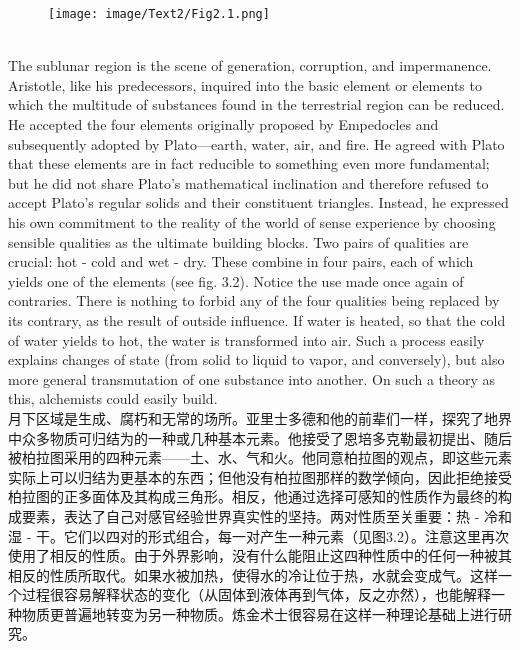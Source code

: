 \documentclass{article}
\begin{document}
\begin{figure} %
    \centering
    \texttt{[image: image/Text2/Fig2.1.png]} %

\end{figure}

\\
The sublunar region is the scene of generation, corruption, and impermanence. Aristotle, like his predecessors, inquired into the basic element or elements to which the multitude of substances found in the terrestrial region can be reduced. He accepted the four elements originally proposed by Empedocles and subsequently adopted by Plato—earth, water, air, and fire. He agreed with Plato that these elements are in fact reducible to something even more fundamental; but he did not share Plato’s mathematical inclination and therefore refused to accept Plato’s regular solids and their constituent triangles. Instead, he expressed his own commitment to the reality of the world of sense experience by choosing sensible qualities as the ultimate building blocks. Two pairs of qualities are crucial: hot - cold and wet - dry. These combine in four pairs, each of which yields one of the elements (see fig. 3.2). Notice the use made once again of contraries. There is nothing to forbid any of the four qualities being replaced by its contrary, as the result of outside influence. If water is heated, so that the cold of water yields to hot, the water is transformed into air. Such a process easily explains changes of state (from solid to liquid to vapor, and conversely), but also more general transmutation of one substance into another. On such a theory as this, alchemists could easily build.\\
月下区域是生成、腐朽和无常的场所。亚里士多德和他的前辈们一样，探究了地界中众多物质可归结为的一种或几种基本元素。他接受了恩培多克勒最初提出、随后被柏拉图采用的四种元素——土、水、气和火。他同意柏拉图的观点，即这些元素实际上可以归结为更基本的东西；但他没有柏拉图那样的数学倾向，因此拒绝接受柏拉图的正多面体及其构成三角形。相反，他通过选择可感知的性质作为最终的构成要素，表达了自己对感官经验世界真实性的坚持。两对性质至关重要：热 - 冷和湿 - 干。它们以四对的形式组合，每一对产生一种元素（见图3.2）。注意这里再次使用了相反的性质。由于外界影响，没有什么能阻止这四种性质中的任何一种被其相反的性质所取代。如果水被加热，使得水的冷让位于热，水就会变成气。这样一个过程很容易解释状态的变化（从固体到液体再到气体，反之亦然），也能解释一种物质更普遍地转变为另一种物质。炼金术士很容易在这样一种理论基础上进行研究。\\
\end{document}
